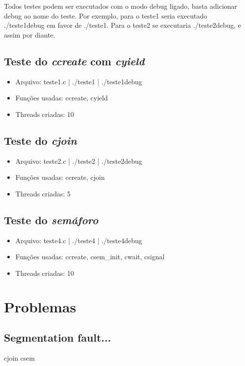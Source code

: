 \documentclass{article}
\begin{document}
Todos testes podem ser executados com o modo debug ligado, basta adicionar debug ao nome do teste. Por exemplo, para o teste1 seria executado ./teste1debug em favor de ./teste1. Para o teste2 se executaria ./teste2debug, e assim por diante.

\subsection{Teste do \textit{ccreate} com \textit{cyield}}
\begin{itemize}
\item Arquivo: teste1.c | ./teste1 | ./teste1debug
\item Funções usadas: ccreate, cyield
\item Threads criadas: 10
\end{itemize}

\subsection{Teste do \textit{cjoin}}
\begin{itemize}
\item Arquivo: teste2.c | ./teste2 | ./teste2debug
\item Funções usadas: ccreate, cjoin
\item Threads criadas: 5
\end{itemize}

\subsection{Teste do \textit{semáforo}}
\begin{itemize}
\item Arquivo: teste4.c | ./teste4 | ./teste4debug
\item Funções usadas: ccreate, csem\_init, cwait, csignal
\item Threads criadas: 10
\end{itemize}

\section{Problemas}
\subsection{Segmentation fault...}
cjoin csem
\end{document}
